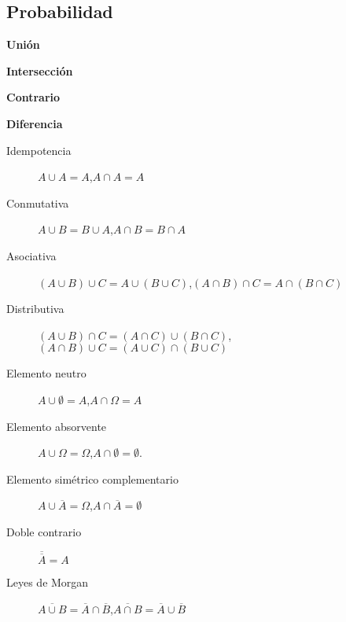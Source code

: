 \begin{multicols*}{2}
  \newpage 

	\subsection*{Probabilidad}

	\begin{tcolorbox}[hbox, title=Operaciones de sucesos]
		\begin{minipage}{0.4\textwidth}
				\textbf{Unión}
				      \begin{center}
					      
				      \end{center}
				\textbf{Intersección}
				      \begin{center}
					      
				      \end{center}
				\textbf{Contrario}
				      \begin{center}
					      
				      \end{center}
				\textbf{Diferencia}
				      \begin{center}
					      
				      \end{center}
		\end{minipage}
  \end{tcolorbox}
  
  \begin{tcolorbox}[hbox, title=Álgebra de sucesos]
		\begin{minipage}{0.4\textwidth}
			\begin{description}
		\item[Idempotencia] $A\cup A=A$,\quad $A\cap A=A$
        \item[Conmutativa] $A\cup B=B\cup A$,\quad $A\cap B = B\cap A$
        \item[Asociativa] $(A\cup B)\cup C = A\cup (B\cup C)$,\quad $(A\cap B)\cap C = A\cap (B\cap C)$
        \item[Distributiva] $(A\cup B)\cap C = (A\cap C)\cup (B\cap C)$,\quad $(A\cap B)\cup C = (A\cup C)\cap (B\cup C)$
        \item[Elemento neutro] $A\cup \emptyset=A$,\quad $A\cap \Omega=A$
        \item[Elemento absorvente] $A\cup \Omega=\Omega$,\quad $A\cap \emptyset=\emptyset$.
        \item[Elemento simétrico complementario] $A\cup \overline A = \Omega$,\quad $A\cap \overline A= \emptyset$
        \item[Doble contrario] $\overline{\overline A} = A$
        \item[Leyes de Morgan] $\overline{A\cup B} = \overline A\cap \overline B$,\quad $\overline{A\cap B} = \overline A\cup \overline B$
			\end{description}
		\end{minipage}
	\end{tcolorbox}


\end{multicols*}
